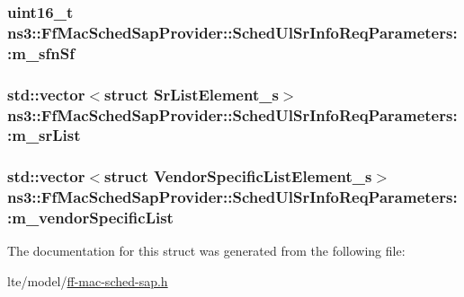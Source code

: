 \subsubsection[{\texorpdfstring{m\+\_\+sfn\+Sf}{m_sfnSf}}]{\setlength{\rightskip}{0pt plus 5cm}uint16\+\_\+t ns3\+::\+Ff\+Mac\+Sched\+Sap\+Provider\+::\+Sched\+Ul\+Sr\+Info\+Req\+Parameters\+::m\+\_\+sfn\+Sf}\hypertarget{structns3_1_1FfMacSchedSapProvider_1_1SchedUlSrInfoReqParameters_ac6b78c1671c1b3e3708331a94192ddba}{}\label{structns3_1_1FfMacSchedSapProvider_1_1SchedUlSrInfoReqParameters_ac6b78c1671c1b3e3708331a94192ddba}
\subsubsection[{\texorpdfstring{m\+\_\+sr\+List}{m_srList}}]{\setlength{\rightskip}{0pt plus 5cm}std\+::vector$<$struct {\bf Sr\+List\+Element\+\_\+s}$>$ ns3\+::\+Ff\+Mac\+Sched\+Sap\+Provider\+::\+Sched\+Ul\+Sr\+Info\+Req\+Parameters\+::m\+\_\+sr\+List}\hypertarget{structns3_1_1FfMacSchedSapProvider_1_1SchedUlSrInfoReqParameters_aa85674561b14624ac5f170dd91b5dbd0}{}\label{structns3_1_1FfMacSchedSapProvider_1_1SchedUlSrInfoReqParameters_aa85674561b14624ac5f170dd91b5dbd0}
\subsubsection[{\texorpdfstring{m\+\_\+vendor\+Specific\+List}{m_vendorSpecificList}}]{\setlength{\rightskip}{0pt plus 5cm}std\+::vector$<$struct {\bf Vendor\+Specific\+List\+Element\+\_\+s}$>$ ns3\+::\+Ff\+Mac\+Sched\+Sap\+Provider\+::\+Sched\+Ul\+Sr\+Info\+Req\+Parameters\+::m\+\_\+vendor\+Specific\+List}\hypertarget{structns3_1_1FfMacSchedSapProvider_1_1SchedUlSrInfoReqParameters_a17b9fd9414c6f5e0318cf5743cfcb9f4}{}\label{structns3_1_1FfMacSchedSapProvider_1_1SchedUlSrInfoReqParameters_a17b9fd9414c6f5e0318cf5743cfcb9f4}


The documentation for this struct was generated from the following file\+:\begin{DoxyCompactItemize}
\item 
lte/model/\hyperlink{ff-mac-sched-sap_8h}{ff-\/mac-\/sched-\/sap.\+h}\end{DoxyCompactItemize}

